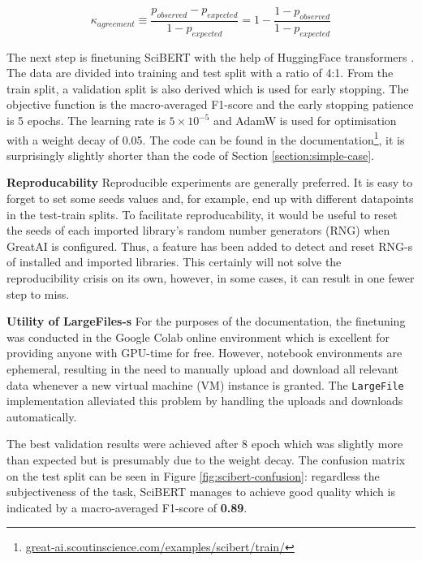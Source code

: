 \begin{equation} \label{equation:kappa}
\kappa_{agreement} \equiv \frac{p_{observed} - p_{expected}}{1 - p_{expected}} = 1 - \frac{1 - p_{observed}}{1 - p_{expected}} 
\end{equation}

The next step is finetuning SciBERT with the help of HuggingFace transformers \cite{wolf2019huggingface}. The data are divided into training and test split with a ratio of 4:1. From the train split, a validation split is also derived which is used for early stopping. The objective function is the macro-averaged F1-score and the early stopping patience is 5 epochs. The learning rate is $5 \times 10^{-5}$ and AdamW \cite{loshchilov2017decoupled} is used for optimisation with a weight decay of 0.05. The code can be found in the documentation\footnote{\href{https://great-ai.scoutinscience.com/examples/scibert/train/}{great-ai.scoutinscience.com/examples/scibert/train/}}, it is surprisingly slightly shorter than the code of Section \ref{section:simple-case}.

\begin{displayquote}
\textbf{Reproducability} Reproducible experiments are generally preferred. It is easy to forget to set some seeds values and, for example, end up with different datapoints in the test-train splits. To facilitate reproducability, it would be useful to reset the seeds of each imported library's random number generators (RNG) when GreatAI is configured. Thus, a feature has been added to detect and reset RNG-s of installed and imported libraries. This certainly will not solve the reproducibility crisis \cite{hutson2018artificial} on its own, however, in some cases, it can result in one fewer step to miss.
\end{displayquote}

\begin{displayquote}
\textbf{Utility of LargeFiles-s} For the purposes of the documentation, the finetuning was conducted in the Google Colab online environment which is excellent for providing anyone with GPU-time for free. However, notebook environments are ephemeral, resulting in the need to manually upload and download all relevant data whenever a new virtual machine (VM) instance is granted. The \texttt{LargeFile} implementation alleviated this problem by handling the uploads and downloads automatically.
\end{displayquote}

The best validation results were achieved after 8 epoch which was slightly more than expected but is presumably due to the weight decay. The confusion matrix on the test split can be seen in Figure \ref{fig:scibert-confusion}: regardless the subjectiveness of the task, SciBERT manages to achieve good quality which is indicated by a macro-averaged F1-score of \textbf{0.89}.

